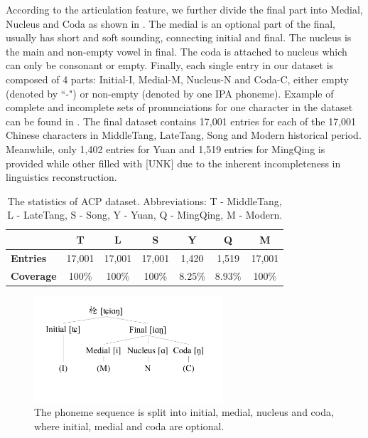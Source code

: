 According to the articulation feature, we further divide the final part into Medial, Nucleus and Coda as shown in . The medial is an optional part of the final, usually has short and soft sounding, connecting initial and final. The nucleus is the main and non-empty vowel in final. The coda is attached to nucleus which can only be consonant or empty. Finally, each single entry in our dataset is composed of 4 parts: Initial-I, Medial-M, Nucleus-N and Coda-C, either empty (denoted by ``-") or non-empty (denoted by one IPA phoneme). Example of complete and incomplete sets of pronunciations for one character in the dataset can be found in . The final dataset contains 17,001 entries for each of the 17,001 Chinese characters in MiddleTang, LateTang, Song and Modern historical period. Meanwhile, only 1,402 entries for Yuan and 1,519 entries for MingQing is provided while other filled with [UNK] due to the inherent incompleteness in linguistics reconstruction.

\begin{table}[ht]
    \centering
    \footnotesize
    \begin{tabular}{l@{\hskip 4pt}c@{\hskip 4pt}c@{\hskip 4pt}c@{\hskip 4pt}c@{\hskip 4pt}c@{\hskip 4pt}c}
    \hline
     & \textbf{T} & \textbf{L} & \textbf{S} & \textbf{Y} & \textbf{Q} & \textbf{M}\\
    \hline
    \textbf{Entries} & 17,001 & 17,001 & 17,001 & 1,420 & 1,519 & 17,001\\
    \textbf{Coverage} & 100\% & 100\% & 100\% & 8.25\% & 8.93\% & 100\%\\
    \hline
    \end{tabular}
    \caption{The statistics of ACP dataset. Abbreviations: T - MiddleTang, L - LateTang, S - Song, Y - Yuan, Q - MingQing, M - Modern.}
    \label{tab:dataset}
\end{table}

\begin{figure}[h!]
    \centering
    \includegraphics[width=7cm]{images/split.pdf}
    \caption{The phoneme sequence is split into initial, medial, nucleus and coda, where initial, medial and coda are optional.
    }
    \label{fig:split}
\end{figure}


